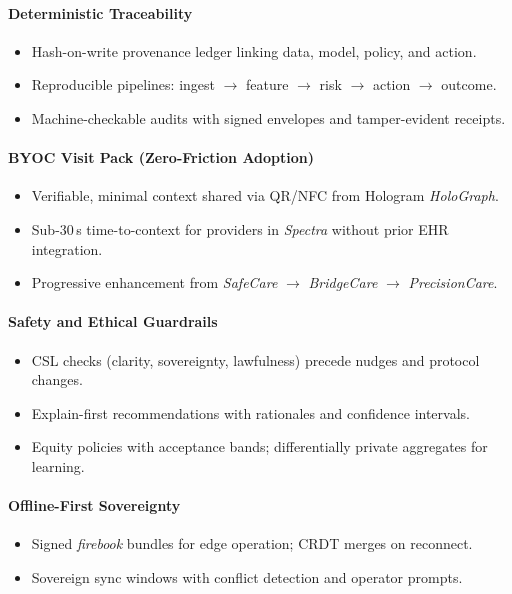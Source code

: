 \documentclass[11pt]{article}
\theoremstyle{plain}
\begin{document}
\paragraph{Deterministic Traceability}
\begin{itemize}
  \item Hash-on-write provenance ledger linking data, model, policy, and action.
  \item Reproducible pipelines: ingest $\rightarrow$ feature $\rightarrow$ risk $\rightarrow$ action $\rightarrow$ outcome.
  \item Machine-checkable audits with signed envelopes and tamper-evident receipts.
\end{itemize}

\paragraph{BYOC Visit Pack (Zero-Friction Adoption)}
\begin{itemize}
  \item Verifiable, minimal context shared via QR/NFC from Hologram \emph{HoloGraph}.
  \item Sub-30\,s time-to-context for providers in \emph{Spectra} without prior EHR integration.
  \item Progressive enhancement from \emph{SafeCare} $\rightarrow$ \emph{BridgeCare} $\rightarrow$ \emph{PrecisionCare}.
\end{itemize}

\paragraph{Safety and Ethical Guardrails}
\begin{itemize}
  \item CSL checks (clarity, sovereignty, lawfulness) precede nudges and protocol changes.
  \item Explain-first recommendations with rationales and confidence intervals.
  \item Equity policies with acceptance bands; differentially private aggregates for learning.
\end{itemize}

\paragraph{Offline-First Sovereignty}
\begin{itemize}
  \item Signed \emph{firebook} bundles for edge operation; CRDT merges on reconnect.
  \item Sovereign sync windows with conflict detection and operator prompts.
\end{itemize}
\end{document}
